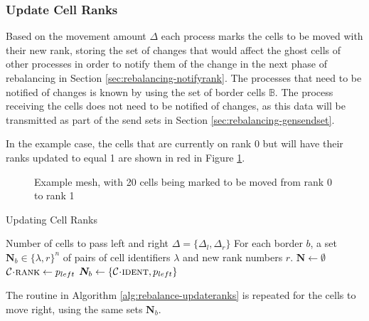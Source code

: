 \documentclass{IIBproject}
\newcommand{\vect}[1]{\bm{#1}}
\newcommand{\acc}{{\mkern 0.5mu\cdot\mkern 0.5mu}}
\begin{document}
\subsubsection{Update Cell Ranks}
\label{sec:rebalancing-updatecellranks}

Based on the movement amount $\Delta$ each process marks the cells to be moved with their new rank, storing the set of changes that would affect the ghost cells of other processes in order to notify them of the change in the next phase of rebalancing in Section \ref{sec:rebalancing-notifyrank}. The processes that need to be notified of changes is known by using the set of border cells $\mathbb{B}$. The process receiving the cells does not need to be notified of changes, as this data will be transmitted as part of the send sets in Section \ref{sec:rebalancing-gensendset}.

In the example case, the cells that are currently on rank 0 but will have their ranks updated to equal 1 are shown in red in Figure \ref{fig:rebalance-ranks}.

\begin{figure}[H]
	\caption{Example mesh, with 20 cells being marked to be moved from rank 0 to rank 1}
	\label{fig:rebalance-ranks}
	
\end{figure}

\begin{algorithm}[H]
\caption{Updating Cell Ranks}
\label{alg:rebalance-updateranks}

\begin{algorithmic}
\Require Number of cells to pass left and right $\Delta = \{\Delta_l,\Delta_r\}$
\Ensure For each border $b$, a set $\vect{N}_b \in \{\lambda,r\}^n$ of pairs of cell identifiers $\lambda$ and new rank numbers $r$.
\Statex
\State $\vect{N} \gets \emptyset$
	\State $\mathcal{C} \acc \textproc{rank} \gets p_{left}$
			\State $\vect{N}_b \gets \{\mathcal{C} \acc \textproc{ident} , p_{left}\}$
		\EndIf
	\EndFor
\EndFor

\end{algorithmic}
\end{algorithm}

The routine in Algorithm \ref{alg:rebalance-updateranks} is repeated for the cells to move right, using the same sets $\vect{N}_b$.
\end{document}
